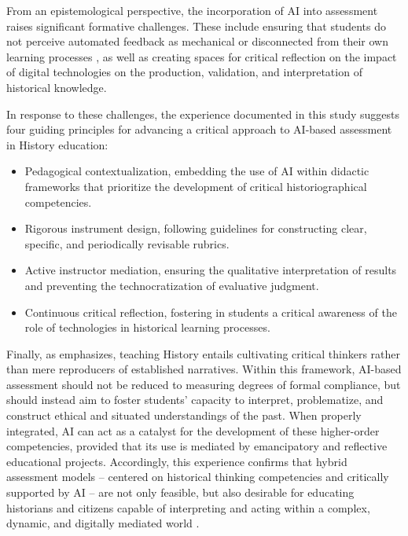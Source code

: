\documentclass[english]{textolivre}
\begin{document}
From an epistemological perspective, the incorporation of AI into assessment raises significant formative challenges. These include ensuring that students do not perceive automated feedback as mechanical or disconnected from their own learning processes \cite{carretero2024, holmes2019}, as well as creating spaces for critical reflection on the impact of digital technologies on the production, validation, and interpretation of historical knowledge.

In response to these challenges, the experience documented in this study suggests four guiding principles for advancing a critical approach to AI-based assessment in History education:

\begin{itemize}
    \item Pedagogical contextualization, embedding the use of AI within didactic frameworks that prioritize the development of critical historiographical competencies.
    \item Rigorous instrument design, following \textcite{panadero2013} guidelines for constructing clear, specific, and periodically revisable rubrics.
    \item Active instructor mediation, ensuring the qualitative interpretation of results and preventing the technocratization of evaluative judgment.
    \item Continuous critical reflection, fostering in students a critical awareness of the role of technologies in historical learning processes.
\end{itemize}

Finally, as \textcite{wineburg2001} emphasizes, teaching History entails cultivating critical thinkers rather than mere reproducers of established narratives. Within this framework, AI-based assessment should not be reduced to measuring degrees of formal compliance, but should instead aim to foster students’ capacity to interpret, problematize, and construct ethical and situated understandings of the past. When properly integrated, AI can act as a catalyst for the development of these higher-order competencies, provided that its use is mediated by emancipatory and reflective educational projects. Accordingly, this experience confirms that hybrid assessment models -- centered on historical thinking competencies and critically supported by AI -- are not only feasible, but also desirable for educating historians and citizens capable of interpreting and acting within a complex, dynamic, and digitally mediated world \cite{carrasco2024, carretero2024, kansteiner2022, tirado2023}.
\end{document}
